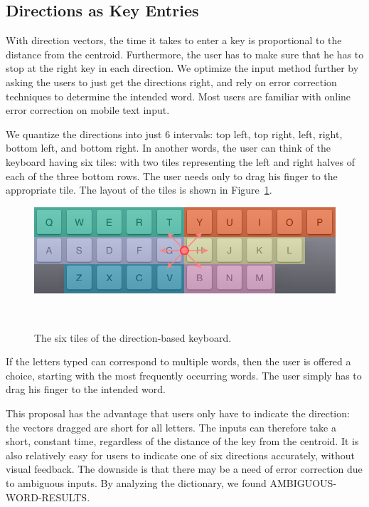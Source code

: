 \subsection{Directions as Key Entries}

With direction vectors, the time it takes to enter a key is proportional to the distance from the centroid.  Furthermore, the user has to make sure that he has to stop at the right key in each direction.  We optimize the input method further by asking the users to just get the directions right, and rely on error correction techniques to determine the intended word.  Most users are familiar with online error correction on mobile text input. 

We quantize the directions into just 6 intervals: top left, top right, left, right, bottom left, and bottom right.   In another words, the user can think of the keyboard having six tiles: with two tiles representing the left and right halves of each of the three bottom rows.  The user needs only to drag his finger to the appropriate tile.  The layout of the tiles is shown in Figure~\ref{fig:swipeVRLayout}.

\begin{figure}
  \centering

  \includegraphics[width=1\columnwidth]{figures/arrows}
  
  \caption{The six tiles of the direction-based keyboard.}
  ~\label{fig:swipeVRLayout}
\end{figure}

If the letters typed can correspond to multiple words, then the user is offered a choice, starting with the most frequently occurring words.  The user simply has to drag his finger to the intended word. 

This proposal has the advantage that users only have to indicate the direction: the vectors dragged are short for all letters.  The inputs can therefore take a short, constant time, regardless of the distance of the key from the centroid.  It is also relatively easy for users to indicate one of six directions accurately, without visual feedback.  The downside is that there may be a need of error correction due to ambiguous inputs.  By analyzing the dictionary, we found AMBIGUOUS-WORD-RESULTS.

